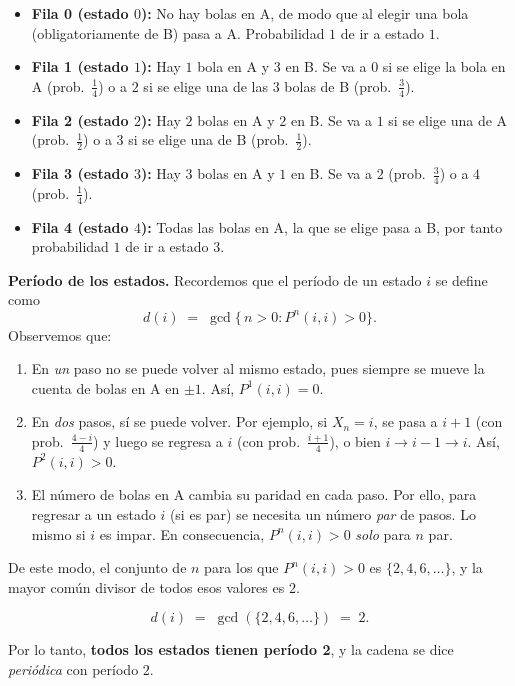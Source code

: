 \documentclass[12pt]{article}
\begin{document}
\begin{itemize}
    \item \textbf{Fila 0 (estado $0$):} No hay bolas en A, de modo que al elegir una bola (obligatoriamente de B) pasa a A. Probabilidad $1$ de ir a estado $1$.
    \item \textbf{Fila 1 (estado $1$):} Hay $1$ bola en A y $3$ en B. Se va a $0$ si se elige la bola en A (prob.\ $\frac{1}{4}$) o a $2$ si se elige una de las $3$ bolas de B (prob.\ $\frac{3}{4}$).
    \item \textbf{Fila 2 (estado $2$):} Hay $2$ bolas en A y $2$ en B. Se va a $1$ si se elige una de A (prob.\ $\frac{1}{2}$) o a $3$ si se elige una de B (prob.\ $\frac{1}{2}$).
    \item \textbf{Fila 3 (estado $3$):} Hay $3$ bolas en A y $1$ en B. Se va a $2$ (prob.\ $\tfrac{3}{4}$) o a $4$ (prob.\ $\tfrac{1}{4}$).
    \item \textbf{Fila 4 (estado $4$):} Todas las bolas en A, la que se elige pasa a B, por tanto probabilidad $1$ de ir a estado $3$.
\end{itemize}

\medskip

\textbf{Período de los estados.}
Recordemos que el período de un estado $i$ se define como
\[
d(i) \;=\; \gcd\bigl\{\,n>0 : P^n(i,i) > 0\bigr\}.
\]
Observemos que:

\begin{enumerate}
    \item En \emph{un} paso no se puede volver al mismo estado, pues siempre se mueve 
          la cuenta de bolas en A en $\pm 1$. Así, $P^1(i,i) = 0$.
    \item En \emph{dos} pasos, sí se puede volver. Por ejemplo, si $X_n = i$, 
          se pasa a $i+1$ (con prob.\ $\frac{4-i}{4}$) y luego se regresa a $i$ 
          (con prob.\ $\frac{i+1}{4}$), o bien $i \to i-1 \to i$. 
          Así, $P^2(i,i) > 0$.
    \item El número de bolas en A cambia su paridad en cada paso. Por ello, para regresar 
          a un estado $i$ (si es par) se necesita un número \emph{par} de pasos. 
          Lo mismo si $i$ es impar. En consecuencia, $P^n(i,i)>0$ \emph{solo} para 
          $n$ par.
\end{enumerate}

De este modo, el conjunto de $n$ para los que $P^n(i,i) > 0$ es 
$\{2,4,6,\dots\}$, y la mayor común divisor de todos esos valores es $2$. 

\[
d(i) \;=\; \gcd(\{2,4,6,\ldots\}) \;=\; 2.
\]

Por lo tanto, \textbf{todos los estados tienen período 2}, y la cadena se dice 
\emph{periódica} con período $2$.
\end{document}
